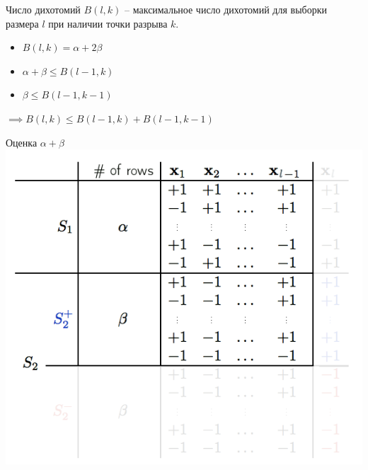 \documentclass[10pt]{beamer}
\begin{document}
\begin{frame}{Число дихотомий}  
  $B(l, k)$ -- максимальное число дихотомий для выборки размера $l$ при наличии точки разрыва $k$.\\
  \bigbreak
  \begin{itemize}
    \item $B(l, k) = \alpha  + 2\beta$
    \item $\alpha + \beta \leq B(l-1, k)$\\
    \item $\beta \leq B(l-1, k-1)$ 
  \end{itemize}
  $\implies B(l, k) \leq B(l-1, k) + B(l-1, k-1)$
\end{frame}

\begin{frame}{Оценка $\alpha + \beta$}  
  \centering
  \includegraphics[width=\textwidth, height=0.8 \textheight, keepaspectratio]{images/breakpoint1}
\end{frame}
\end{document}

